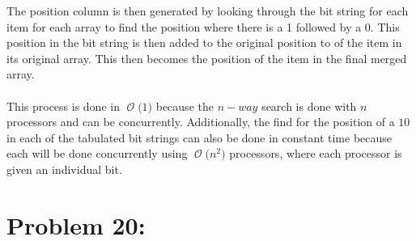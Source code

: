 \documentclass[12pt]{article}
\newcommand{\BigO}[1]{\ensuremath{\operatorname{\mathcal{O}}\bigl(#1\bigr)}}
\begin{document}
The position column is then generated by looking through the bit
string for each item for each array to find the position where 
there is a 1 followed by a 0.  This position in the bit string 
is then added to the original position to of the item in its 
original array.  This then becomes the position of the item
in the final merged array.\\\\
This process is done in \BigO{1} because the $n-way$ search
is done with $n$ processors and can be concurrently.  Additionally,
the find for the position of a $10$ in each of the tabulated
bit strings can also be done in constant time because each will
be done concurrently using \BigO{n^2} processors, where each processor
is given an individual bit.             
\section*{Problem 20: }
\end{document}
